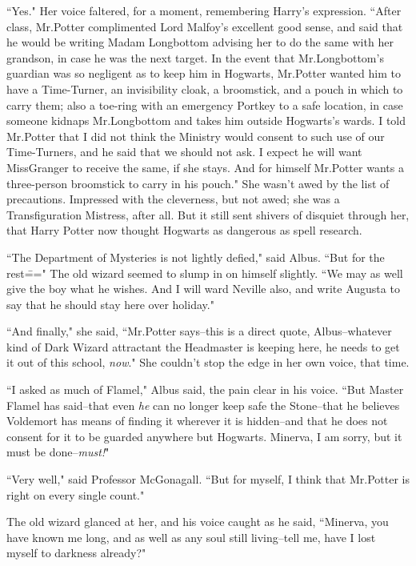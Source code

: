 ``Yes." Her voice faltered, for a moment, remembering Harry's expression. ``After class, Mr.\?Potter complimented Lord Malfoy's excellent good sense, and said that he would be writing Madam Longbottom advising her to do the same with her grandson, in case he was the next target. In the event that Mr.\?Longbottom's guardian was so negligent as to keep him in Hogwarts, Mr.\?Potter wanted him to have a Time-Turner, an invisibility cloak, a broomstick, and a pouch in which to carry them; also a toe-ring with an emergency Portkey to a safe location, in case someone kidnaps Mr.\?Longbottom and takes him outside Hogwarts's wards. I told Mr.\?Potter that I did not think the Ministry would consent to such use of our Time-Turners, and he said that we should not ask. I expect he will want Miss\?Granger to receive the same, if she stays. And for himself Mr.\?Potter wants a three-person broomstick to carry in his pouch." She wasn't awed by the list of precautions. Impressed with the cleverness, but not awed; she was a Transfiguration Mistress, after all. But it still sent shivers of disquiet through her, that Harry Potter now thought Hogwarts as dangerous as spell research.

``The Department of Mysteries is not lightly defied," said Albus. ``But for the rest\===" The old wizard seemed to slump in on himself slightly. ``We may as well give the boy what he wishes. And I will ward Neville also, and write Augusta to say that he should stay here over holiday."

``And finally," she said, ``Mr.\?Potter says\---this is a direct quote, Albus\---whatever kind of Dark Wizard attractant the Headmaster is keeping here, he needs to get it out of this school, \emph{now}." She couldn't stop the edge in her own voice, that time.

``I asked as much of Flamel," Albus said, the pain clear in his voice. ``But Master Flamel has said\---that even \emph{he} can no longer keep safe the Stone\---that he believes Voldemort has means of finding it wherever it is hidden\---and that he does not consent for it to be guarded anywhere but Hogwarts. Minerva, I am sorry, but it must be done\---\emph{must!}"

``Very well," said Professor McGonagall. ``But for myself, I think that Mr.\?Potter is right on every single count."

The old wizard glanced at her, and his voice caught as he said, ``Minerva, you have known me long, and as well as any soul still living\---tell me, have I lost myself to darkness already?"

